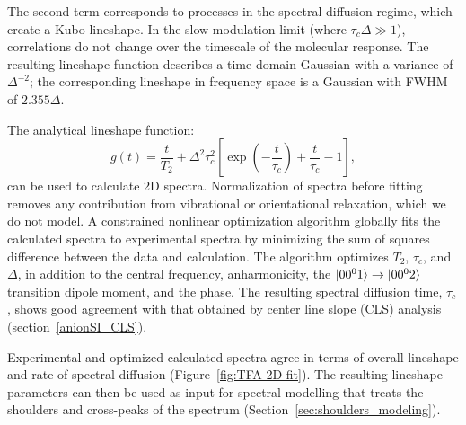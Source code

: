 \documentclass[%
  class = book,%
  crop = false,%
  float = true,%
  multi = true,%
  preview = false,%
]{standalone}
\begin{document}
{The second term corresponds to processes in the spectral diffusion regime, which create a Kubo lineshape. In the slow modulation limit (where \(\tau_c \Delta \gg 1\)), correlations do not change over the timescale of the molecular response. The resulting lineshape function describes a time-domain Gaussian with a variance of \(\Delta^{-2}\); the corresponding lineshape in frequency space is a Gaussian with FWHM of \(2.355\Delta\).

The analytical lineshape function:
\begin{equation}
  \label{eq:g(t)}
  g(t) = \frac{t}{T_2} + \Delta^2\tau_c^2 \left[ \exp{\left( -\frac{t}{\tau_c} \right)}
	+ \frac{t}{\tau_c} - 1 \right],
\end{equation}
can be used to calculate 2D spectra. Normalization of spectra before fitting removes any contribution from vibrational or orientational relaxation, which we do not model. A constrained nonlinear optimization algorithm globally fits the calculated spectra to experimental spectra by minimizing the sum of squares difference between the data and calculation. The algorithm optimizes \(T_2\), \(\tau_c\), and \(\Delta\), in addition to the central frequency, anharmonicity, the \(\ket{00^01} \rightarrow \ket{00^02}\) transition dipole moment, and the phase. The resulting spectral diffusion time, \(\tau_c\), shows good agreement with that obtained by center line slope (CLS) analysis (section~\ref{anionSI_CLS}).

Experimental and optimized calculated spectra agree in terms of overall lineshape and rate of spectral diffusion (Figure~\ref{fig:TFA 2D fit}). The resulting lineshape parameters can then be used as input for spectral modelling that treats the shoulders and cross-peaks of the spectrum (Section~\ref{sec:shoulders_modeling}).

}
\end{document}

